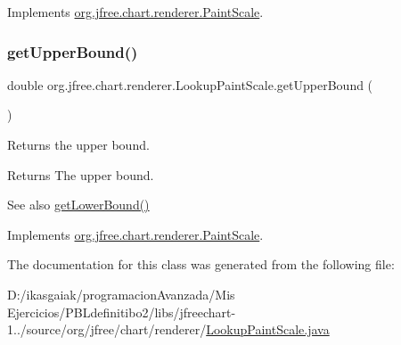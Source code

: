 Implements \mbox{\hyperlink{interfaceorg_1_1jfree_1_1chart_1_1renderer_1_1_paint_scale_a32b81d8ac78e030422937dc97526661d}{org.\+jfree.\+chart.\+renderer.\+Paint\+Scale}}.

\mbox{\label{classorg_1_1jfree_1_1chart_1_1renderer_1_1_lookup_paint_scale_ad7956f5f6498550f77ce5c7ed8f22583}} 
\subsubsection{\texorpdfstring{get\+Upper\+Bound()}{getUpperBound()}}
{\footnotesize\ttfamily double org.\+jfree.\+chart.\+renderer.\+Lookup\+Paint\+Scale.\+get\+Upper\+Bound (\begin{DoxyParamCaption}{ }\end{DoxyParamCaption})}

Returns the upper bound.

\begin{DoxyReturn}{Returns}
The upper bound.
\end{DoxyReturn}
\begin{DoxySeeAlso}{See also}
\mbox{\hyperlink{classorg_1_1jfree_1_1chart_1_1renderer_1_1_lookup_paint_scale_a7ef26ef52021e5a5c09b28c174913511}{get\+Lower\+Bound()}} 
\end{DoxySeeAlso}


Implements \mbox{\hyperlink{interfaceorg_1_1jfree_1_1chart_1_1renderer_1_1_paint_scale_abf6986bb5661248213645ea975828495}{org.\+jfree.\+chart.\+renderer.\+Paint\+Scale}}.



The documentation for this class was generated from the following file\+:\begin{DoxyCompactItemize}
\item 
D\+:/ikasgaiak/programacion\+Avanzada/\+Mis Ejercicios/\+P\+B\+Ldefinitibo2/libs/jfreechart-\/1../source/org/jfree/chart/renderer/\mbox{\hyperlink{_lookup_paint_scale_8java}{Lookup\+Paint\+Scale.\+java}}\end{DoxyCompactItemize}
